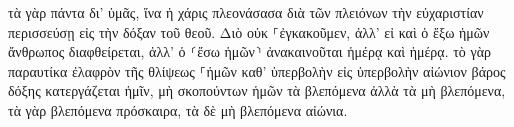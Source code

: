 \documentclass{openreader}
\begin{document}
τὰ γὰρ πάντα δι’ ὑμᾶς, ἵνα ἡ χάρις πλεονάσασα διὰ τῶν πλειόνων τὴν εὐχαριστίαν περισσεύσῃ εἰς τὴν δόξαν τοῦ θεοῦ. 
Διὸ οὐκ ⸀ἐγκακοῦμεν, ἀλλ’ εἰ καὶ ὁ ἔξω ἡμῶν ἄνθρωπος διαφθείρεται, ἀλλ’ ὁ ⸂ἔσω ἡμῶν⸃ ἀνακαινοῦται ἡμέρᾳ καὶ ἡμέρᾳ. 
τὸ γὰρ παραυτίκα ἐλαφρὸν τῆς θλίψεως ⸀ἡμῶν καθ’ ὑπερβολὴν εἰς ὑπερβολὴν αἰώνιον βάρος δόξης κατεργάζεται ἡμῖν, 
μὴ σκοπούντων ἡμῶν τὰ βλεπόμενα ἀλλὰ τὰ μὴ βλεπόμενα, τὰ γὰρ βλεπόμενα πρόσκαιρα, τὰ δὲ μὴ βλεπόμενα αἰώνια. 
\end{document}
